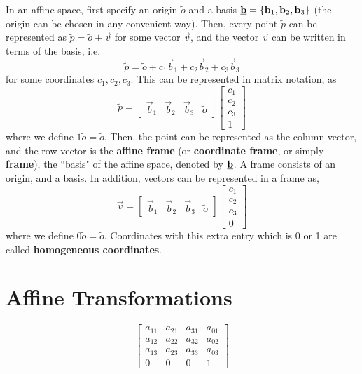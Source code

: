 \documentclass[letterpaper,12pt]{article}
\begin{document}
In an affine space, first specify an origin $\tilde{o}$ and a basis $\underline{\mathbf{b}} = \left\{ \mathbf{b}_1, \mathbf{b}_2, \mathbf{b}_3 \right\}$ (the origin can be chosen in any convenient way). Then, every point $\tilde{p}$ can be represented as $\tilde{p} = \tilde{o} + \vec{v}$ for some vector $\vec{v}$, and the vector $\vec{v}$ can be written in terms of the basis, i.e.
\begin{equation*}
    \tilde{p} = \tilde{o} + c_1 \vec{b}_1 + c_2 \vec{b}_2 + c_3 \vec{b}_3
\end{equation*}
for some coordinates $c_1, c_2, c_3$. This can be represented in matrix notation, as
\begin{equation*}
    \tilde{p} = \begin{bmatrix} \vec{b}_1 & \vec{b}_2 & \vec{b}_3 & \tilde{o} \end{bmatrix} \begin{bmatrix} c_1 \\ c_2 \\ c_3 \\ 1 \end{bmatrix}
\end{equation*}
where we define $1\tilde{o} = \tilde{o}$. Then, the point can be represented as the column vector, and the row vector is the \textbf{affine frame} (or \textbf{coordinate frame}, or simply \textbf{frame}), the ``basis" of the affine space, denoted by $\tilde{\underline{\mathbf{b}}}$. A frame consists of an origin, and a basis. In addition, vectors can be represented in a frame as,
\begin{equation*}
    \vec{v} = \begin{bmatrix} \vec{b}_1 & \vec{b}_2 & \vec{b}_3 & \tilde{o} \end{bmatrix} \begin{bmatrix} c_1 \\ c_2 \\ c_3 \\ 0 \end{bmatrix}
\end{equation*}
where we define $0 \tilde{o} = \tilde{o}$. Coordinates with this extra entry which is 0 or 1 are called \textbf{homogeneous coordinates}. 

\section*{Affine Transformations}

\begin{equation*}
    \begin{bmatrix} a_{11} & a_{21} & a_{31} & a_{01} \\ a_{12} & a_{22} & a_{32} & a_{02} \\ a_{13} & a_{23} & a_{33} & a_{03} \\ 0 & 0 & 0 & 1 \end{bmatrix}
\end{equation*}
\end{document}
